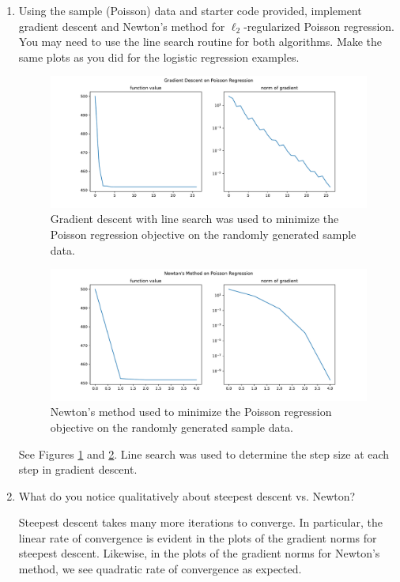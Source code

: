 \documentclass[11pt]{amsart}
\begin{document}
\begin{enumerate}
\begin{enumerate}
\item Using the sample (Poisson) data  and starter code provided, implement gradient descent and Newton's method for $\ell_2$-regularized Poisson regression. You may need to use the line search routine for 
  both algorithms. Make the same plots as you did for the logistic regression examples.

  \begin{figure}
  \centering
  \includegraphics[width=\textwidth]{poisson_gradient_descent.pdf}
  \caption{Gradient descent with line search was used to minimize the Poisson
    regression objective on the randomly generated sample data.}
  \label{fig:poisson_gradient_descent}
\end{figure}

\begin{figure}
  \centering
  \includegraphics[width=\textwidth]{poisson_newton.pdf}
  \caption{Newton's method used to minimize the Poisson regression objective on
    the randomly generated sample data.}
  \label{fig:poisson_newton}
\end{figure}

See Figures \ref{fig:poisson_gradient_descent} and
\ref{fig:poisson_newton}. Line search was used to determine the step size at
each step in gradient descent.
  
\item What do you notice qualitatively about steepest descent vs. Newton?

  Steepest descent takes many more iterations to converge. In particular, the
  linear rate of convergence is evident in the plots of the gradient norms for
  steepest descent. Likewise, in the plots of the gradient norms for Newton's
  method, we see quadratic rate of convergence as expected. 
\end{enumerate}

\bigskip\bigskip




\end{enumerate}
\end{document}
